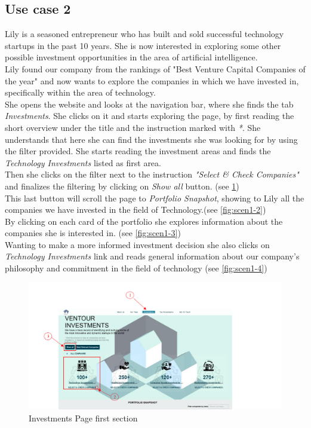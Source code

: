 \documentclass[../../DD.tex]{subfiles}
\begin{document}
		\subsection{Use case 2}
			Lily is a seasoned entrepreneur who has built and sold successful technology startups in the past 10 years. She is now interested in exploring some other possible investment opportunities in the area of artificial intelligence.\\ Lily found our company from the rankings of "Best Venture Capital Companies of the year" and now wants to explore the companies in which we have invested in, specifically within the area of technology.\\
			She opens the website and looks at the navigation bar, where she finds the tab \textit{Investments}. She clicks on it and starts exploring the page, by first reading the short overview under the title and the instruction marked with \textit{*}. She understands that here she can find the investments she was looking for by using the filter provided. She starts reading the investment areas and finds the \textit{Technology Investments} listed as first area.\\Then she clicks on the filter next to the instruction \textit{"Select \& Check Companies"} and finalizes the filtering by clicking on \textit{Show all} button. (see \ref{fig:scen1-1}) \\ This last button will scroll the page to \textit{Portfolio Snapshot}, showing to Lily all the companies we have invested in the field of Technology.(see \ref{fig:scen1-2})\\ By clicking on each card of the portfolio she explores information about the companies she is interested in. (see \ref{fig:scen1-3})\\ Wanting to make a more informed investment decision she also clicks on \textit{Technology Investments} link and reads general information about our company's  philosophy and commitment in the field of technology (see \ref{fig:scen1-4})
   
   \begin{figure}[!htb]
       \centering
       \includegraphics[width=\textwidth]{Images/scenarios/scenario investments1.png}
       \caption{Investments Page first section}
       \label{fig:scen1-1}
   \end{figure}
   
\end{document}

